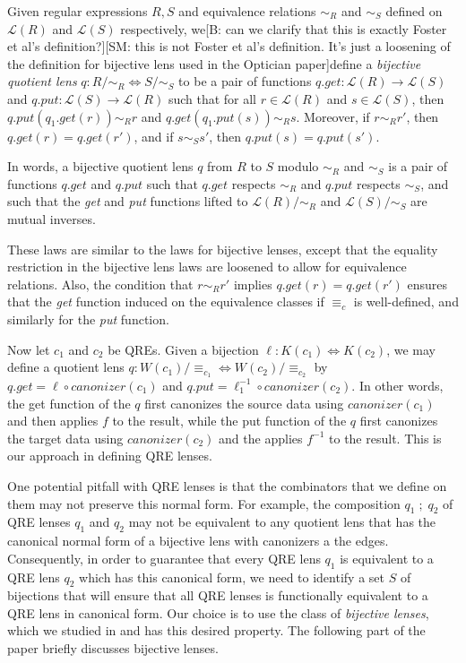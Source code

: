 \documentclass[acmsmall,review,anonymous]{acmart}
\newcommand{\FINISH}[3]{\ifdraft\textcolor{#1}{[#2: #3]}\fi}
\newcommand{\bcp}[1]{\FINISH{dkred}{B}{#1}}
\newcommand{\sam}[1]{\FINISH{dkpurple}{SM}{#1}}
\newcommand{\kw}[1]{\ensuremath{\mathit{#1}}}
\newcommand{\canonizer}{\ensuremath{\kw{canonizer}}}
\newcommand{\get}{\ensuremath{\kw{get}}}
\newcommand{\lput}{\ensuremath{\kw{put}}}
\newcommand{\eqrel}[1]{\ensuremath{\equiv_{#1}}}
\begin{document}
Given regular expressions $R, S$ and equivalence relations
$\sim_R$ and $\sim_S$ defined on $\mathcal{L}(R)$ and $\mathcal{L}(S)$
respectively, we\bcp{can we clarify that this is exactly Foster et al's
definition?}\sam{this is not Foster et al's definition. It's just a
loosening of the definition for bijective lens used in the Optician paper}define
a {\em bijective quotient lens} $q :
R /{\sim_R} \Leftrightarrow S/{\sim_S}$ to be a pair of functions $q.\get :
\mathcal{L}(R) \longrightarrow \mathcal{L}(S)$ and $q.\lput : \mathcal{L}(S)
\longrightarrow \mathcal{L}(R)$ such that for all $r \in \mathcal{L}(R)$ and $s
\in \mathcal{L}(S)$, then $q.\lput(q_1.\get(r)) \sim_R r$ and
$q.\get(q_1.\lput(s)) \sim_R s$. Moreover, if $r \sim_R r'$, then $q.\get(r) =
q.\get(r')$, and if $s \sim_S s'$, then $q.\lput(s) = q.\lput(s')$.

In words, a bijective quotient lens $q$ from $R$ to $S$ modulo $\sim_R$
and $\sim_S$ is a pair of functions $q.\get$ and $q.\lput$ such that
$q.\get$ respects $\sim_R$ and $q.\lput$ respects $\sim_S$, and such that
the {\em get} and {\em put} functions lifted to $\mathcal{L}(R)/{\sim_R}$ and
$\mathcal{L}(S)/{\sim_S}$ are mutual inverses.

These laws are similar to the laws for bijective lenses, except that the
equality restriction in the bijective lens laws are loosened to allow for
equivalence relations. Also, the condition that $r \sim_R r'$ implies
$q.\get(r) = q.\get(r')$ ensures that the {\em get} function induced on
the equivalence classes if $\equiv_c$ is well-defined, and similarly for
the {\em put} function. 

Now let $c_1$ and $c_2$ be QREs. Given a bijection $\ell : K(c_1)
\Leftrightarrow K(c_2)$, we may define a quotient lens $q : W(c_1)/\eqrel{c_1}
\Leftrightarrow W(c_2)/\eqrel{c_2}$ by $q.\get = \ell \circ \canonizer(c_1)
$ and $q.\lput = \ell_1^{-1} \circ \canonizer(c_2)$. In other words, the get
function of the $q$ first canonizes the source data using $\canonizer(c_1)$
and then applies $f$ to the result, while the put function of the $q$ first
canonizes the target data using $\canonizer(c_2)$ and the applies $f^{-1}$ to
the result. This is our approach in defining QRE lenses.

One potential pitfall with QRE lenses is that the combinators that
we define on them may not preserve this normal form. For example, the
composition $q_1 \; ; \; q_2$ of QRE lenses $q_1$ and $q_2$ may not be
equivalent to any quotient lens that has the canonical normal form of a
bijective lens with canonizers a the edges. Consequently, in order to guarantee
that every QRE lens $q_1$ is equivalent to a QRE lens $q_2$ which has this
canonical form, we need to identify a set $S$ of bijections that will ensure
that all QRE lenses is functionally equivalent to a QRE lens in canonical form.
Our choice is to use the class of \textit{bijective lenses}, which we studied in
\cite{optician} and has this desired property. The following part of the paper
briefly discusses bijective lenses.
\end{document}
